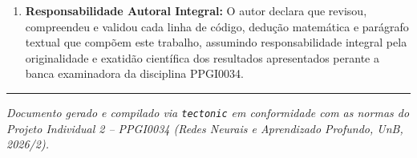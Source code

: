 \documentclass[9pt,a4paper]{extarticle}
\begin{document}
\begin{enumerate}[leftmargin=1.4em, itemsep=1.5pt, topsep=1pt]
    \item \textbf{Responsabilidade Autoral Integral:} O autor declara que revisou, compreendeu e validou cada linha de c\'{o}digo, dedu\c{c}\~{a}o matem\'{a}tica e par\'{a}grafo textual que comp\~{o}em este trabalho, assumindo responsabilidade integral pela originalidade e exatid\~{a}o cient\'{i}fica dos resultados apresentados perante a banca examinadora da disciplina PPGI0034.
\end{enumerate}

\vspace{1pt}
\noindent\textcolor{unbblue}{\rule{\linewidth}{0.8pt}}
\begin{center}
\vspace{-4pt}
\scriptsize \textit{Documento gerado e compilado via \texttt{tectonic} em conformidade com as normas do Projeto Individual 2 -- PPGI0034 (Redes Neurais e Aprendizado Profundo, UnB, 2026/2).}
\end{center}
\end{document}
